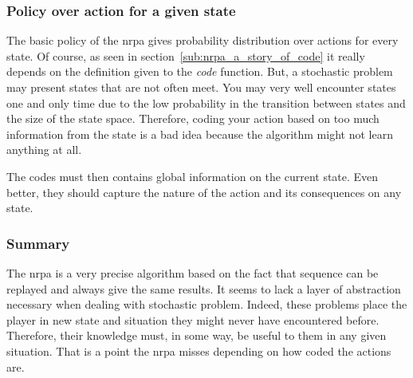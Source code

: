 \subsubsection{Policy over action for a given state}%
\label{ssub:policy_over_action_for_a_given_state}

The basic policy of the \gls{nrpa} gives probability distribution over actions for every state.
Of course, as seen in section~\ref{sub:nrpa_a_story_of_code} it really depends on the definition given to the \textit{code}  function.
But, a stochastic problem may present states that are not often meet.
You may very well encounter states one and only time due to the low probability in the transition between states and the size of the state space.
Therefore, coding your action based on too much information from the state is a bad idea because the algorithm might not learn anything at all.

The codes must then contains global information on the current state.
Even better, they should capture the nature of the action and its consequences on any state.

\subsubsection{Summary}%
\label{ssub:summary}

The \gls{nrpa} is a very precise algorithm based on the fact that sequence can be replayed and always give the same results.
It seems to lack a layer of abstraction necessary when dealing with stochastic problem.
Indeed, these problems place the player in new state and situation they might never have encountered before.
Therefore, their knowledge must, in some way, be useful to them in any given situation.
That is a point the \gls{nrpa} misses depending on how coded the actions are.

